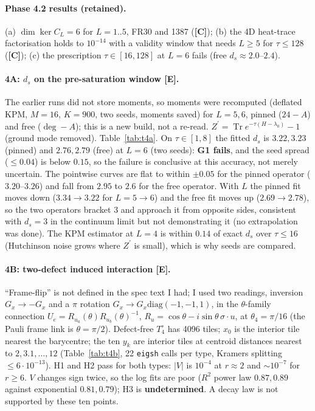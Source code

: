 \documentclass[10pt]{article}
\newcommand{\lab}[1]{\textbf{[#1]}}
\begin{document}
\paragraph{Phase 4.2 results (retained).} (a) $\dim\ker C_L=6$ for $L=1..5$, FR30 and 1387 (\lab{C}); (b) the 4D heat-trace factorisation holds to $10^{-14}$ with a validity window that needs $L\ge5$ for $\tau\le128$ (\lab{C}); (c) the prescription $\tau\in[16,128]$ at $L=6$ fails (free $d_s\approx2.0$--$2.4$).



\paragraph{4A: $d_s$ on the pre-saturation window \lab{E}.} The earlier runs did not store moments, so moments were recomputed (deflated KPM, $M=16$, $K=900$, two seeds, moments saved) for $L=5,6$, pinned ($24-A$) and free ($\deg-A$); this is a new build, not a re-read. $Z^\prime=\operatorname{Tr}e^{-\tau(H-\lambda_0)}-1$ (ground mode removed). Table~\ref{tab:t4a}. On $\tau\in[1,8]$ the fitted $d_s$ is $3.22,3.23$ (pinned) and $2.76,2.79$ (free) at $L=6$ (two seeds): \textbf{G1 fails}, and the seed spread ($\le0.04$) is below $0.15$, so the failure is conclusive at this accuracy, not merely uncertain. The pointwise curves are flat to within $\pm0.05$ for the pinned operator ($3.20$--$3.26$) and fall from $2.95$ to $2.6$ for the free operator. With $L$ the pinned fit moves down ($3.34\to3.22$ for $L=5\to6$) and the free fit moves up ($2.69\to2.78$), so the two operators bracket $3$ and approach it from opposite sides, consistent with $d_s=3$ in the continuum limit but not demonstrating it (no extrapolation was done). The KPM estimator at $L=4$ is within $0.14$ of exact $d_s$ over $\tau\le16$ (Hutchinson noise grows where $Z^\prime$ is small), which is why seeds are compared.


\paragraph{4B: two-defect induced interaction \lab{E}.} ``Frame-flip'' is not defined in the spec text I had; I used two readings, inversion $G_x\to-G_x$ and a $\pi$ rotation $G_x\to G_x\mathrm{diag}(-1,-1,1)$, in the $\theta$-family connection $U_e=R_{u_a}(\theta)R_{u_b}(\theta)^{-1}$, $R_u=\cos\theta-i\sin\theta\,\sigma\!\cdot\!u$, at $\theta_4=\pi/16$ (the Pauli frame link is $\theta=\pi/2$). Defect-free $T_4^\circ$ has 4096 tiles; $x_0$ is the interior tile nearest the barycentre; the ten $y_k$ are interior tiles at centroid distances nearest to $2,3.1,\dots,12$ (Table~\ref{tab:t4b}, 22 \texttt{eigsh} calls per type, Kramers splitting $\le6\cdot10^{-13}$). H1 and H2 pass for both types: $|V|$ is $10^{-4}$ at $r\approx2$ and $\sim10^{-7}$ for $r\ge6$. $V$ changes sign twice, so the log fits are poor ($R^2$ power law $0.87,0.89$ against exponential $0.81,0.79$); H3 is \textbf{undetermined}. A decay law is not supported by these ten points.

\end{document}
